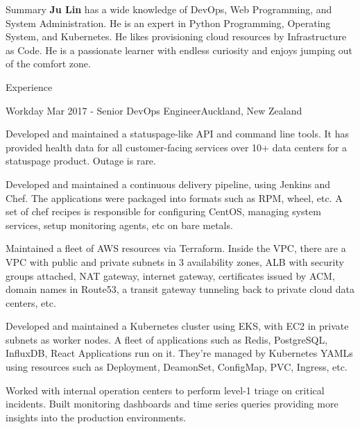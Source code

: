 \documentclass{resume}
\begin{document}
  \begin{rSection}{Summary}
    { {\bf Ju Lin } has a wide knowledge of DevOps, Web Programming, and System Administration. He is an expert in Python Programming, Operating System, and Kubernetes. He likes provisioning cloud resources by Infrastructure as Code. He is a passionate learner with endless curiosity and enjoys jumping out of the comfort zone. }
  \end{rSection}

  \begin{rSection}{Experience}

    \begin{rSubsection}{Workday}{ Mar 2017 - }{Senior DevOps Engineer}{Auckland, New Zealand}
    \item Developed and maintained a statuspage-like API and command line tools. It has provided health data for all customer-facing services over 10+ data centers for a statuspage product. Outage is rare.
    \item Developed and maintained a continuous delivery pipeline, using Jenkins and Chef. The applications were packaged into formats such as RPM, wheel, etc. A set of chef recipes is responsible for configuring CentOS, managing system services, setup monitoring agents, etc on bare metals.
    \item Maintained a fleet of AWS resources via Terraform. Inside the VPC, there are a VPC with public and private subnets in 3 availability zones, ALB with security groups attached, NAT gateway, internet gateway, certificates issued by ACM, domain names in Route53, a transit gateway tunneling back to private cloud data centers, etc.
    \item Developed and maintained a Kubernetes cluster using EKS, with EC2 in private subnets as worker nodes. A fleet of applications such as Redis, PostgreSQL, InfluxDB, React Applications run on it. They're managed by Kubernetes YAMLs using resources such as Deployment, DeamonSet, ConfigMap, PVC, Ingress, etc.
    \item Worked with internal operation centers to perform level-1 triage on critical incidents. Built monitoring dashboards and time series queries providing more insights into the production environments.
    \end{rSubsection}


\end{rSection}
\end{document}
